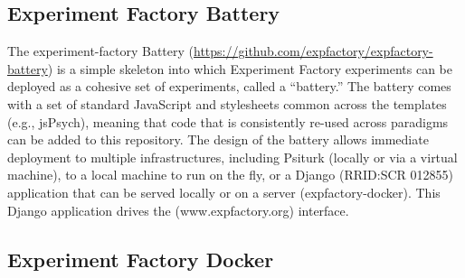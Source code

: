 \documentclass{report}
\begin{document}
\subsection{Experiment Factory Battery}

The experiment-factory Battery
(\href{https://github.com/expfactory/expfactory-battery}{https://github.com/expfactory/expfactory-battery}) is a simple skeleton
into which Experiment Factory experiments can be deployed as a cohesive
set of experiments, called a ``battery.'' The battery comes with a set
of standard JavaScript and stylesheets common across the templates
(e.g., jsPsych), meaning that code that is consistently re-used across
paradigms can be added to this repository. The design of the battery
allows immediate deployment to multiple infrastructures, including
Psiturk (locally or via a virtual machine), to a local machine to run on
the fly, or a Django (RRID:SCR 012855) application that can be served
locally or on a server (expfactory-docker). This Django application
drives the (www.expfactory.org) interface.

\subsection{Experiment Factory Docker}
\end{document}
